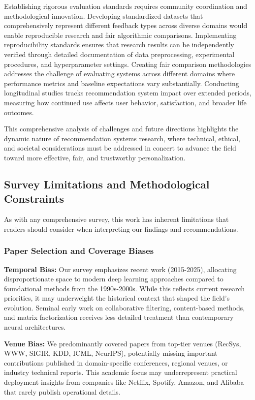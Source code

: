 Establishing rigorous evaluation standards requires community coordination and methodological innovation. Developing standardized datasets that comprehensively represent different feedback types across diverse domains would enable reproducible research and fair algorithmic comparisons. Implementing reproducibility standards ensures that research results can be independently verified through detailed documentation of data preprocessing, experimental procedures, and hyperparameter settings. Creating fair comparison methodologies addresses the challenge of evaluating systems across different domains where performance metrics and baseline expectations vary substantially. Conducting longitudinal studies tracks recommendation system impact over extended periods, measuring how continued use affects user behavior, satisfaction, and broader life outcomes.

This comprehensive analysis of challenges and future directions highlights the dynamic nature of recommendation systems research, where technical, ethical, and societal considerations must be addressed in concert to advance the field toward more effective, fair, and trustworthy personalization.

\subsection{Survey Limitations and Methodological Constraints}

As with any comprehensive survey, this work has inherent limitations that readers should consider when interpreting our findings and recommendations.

\subsubsection{Paper Selection and Coverage Biases}

\textbf{Temporal Bias:} Our survey emphasizes recent work (2015-2025), allocating disproportionate space to modern deep learning approaches compared to foundational methods from the 1990s-2000s. While this reflects current research priorities, it may underweight the historical context that shaped the field's evolution. Seminal early work on collaborative filtering, content-based methods, and matrix factorization receives less detailed treatment than contemporary neural architectures.

\textbf{Venue Bias:} We predominantly covered papers from top-tier venues (RecSys, WWW, SIGIR, KDD, ICML, NeurIPS), potentially missing important contributions published in domain-specific conferences, regional venues, or industry technical reports. This academic focus may underrepresent practical deployment insights from companies like Netflix, Spotify, Amazon, and Alibaba that rarely publish operational details.

